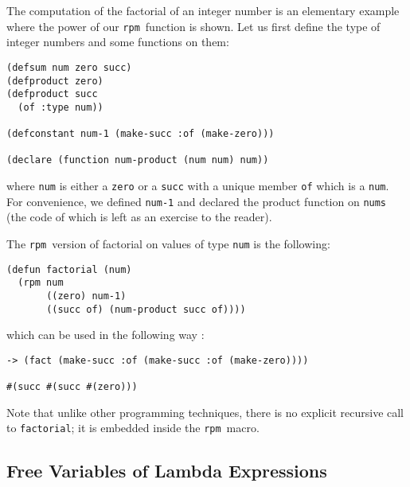 \documentclass[a4paper,11pt]{article}
\newcommand{\rpm}{\texttt{rpm}}
\begin{document}
The computation of the factorial of an integer number is an elementary
example where the power of our \rpm\ function is shown. Let us first
define the type of integer numbers and some functions on them:
\begin{verbatim}
(defsum num zero succ)
(defproduct zero)
(defproduct succ 
  (of :type num))

(defconstant num-1 (make-succ :of (make-zero)))

(declare (function num-product (num num) num))
\end{verbatim}
where \texttt{num} is either a \texttt{zero} or a \texttt{succ} with a
unique member \texttt{of} which is a \texttt{num}. For convenience, we
defined \texttt{num-1} and declared the product function on \texttt{nums}
(the code of which is left as an exercise to the reader).

The \rpm\ version of factorial on values of type \texttt{num} is the
following:
\begin{verbatim}
(defun factorial (num)
  (rpm num
       ((zero) num-1)
       ((succ of) (num-product succ of))))
\end{verbatim}
which can be used in the following way :
\begin{verbatim}
-> (fact (make-succ :of (make-succ :of (make-zero))))

#(succ #(succ #(zero)))
\end{verbatim}
Note that unlike other programming techniques, there is no explicit
recursive call to \texttt{factorial}; it is embedded inside the 
\rpm\ macro.

\subsection{Free Variables of Lambda Expressions}
\end{document}
